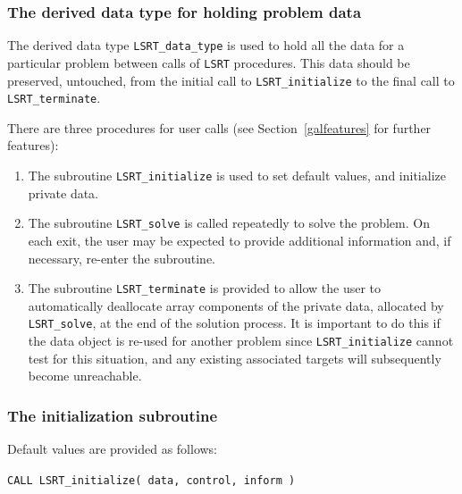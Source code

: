 \documentclass{galahad}
\newcommand{\packagename}{LS\-RT}
\begin{document}

\subsubsection{The derived data type for holding problem data}\label{typedata}
The derived data type
{\tt \packagename\_data\_type}
is used to hold all the data for a particular problem between calls of
{\tt \packagename} procedures.
This data should be preserved, untouched, from the initial call to
{\tt \packagename\_initialize}
to the final call to
{\tt \packagename\_terminate}.


\galarguments
There are three procedures for user calls
(see Section~\ref{galfeatures} for further features):

\begin{enumerate}
\item The subroutine
      {\tt \packagename\_initialize}
      is used to set default values, and initialize private data.
\item The subroutine
      {\tt \packagename\_solve}
      is called repeatedly to solve the problem.
      On each exit, the user may be expected to provide additional
      information and, if necessary, re-enter the subroutine.
\item The subroutine
      {\tt \packagename\_terminate}
      is provided to allow the user to automatically deallocate array
       components of the private data, allocated by
       {\tt \packagename\_solve},
       at the end of the solution process.
       It is important to do this if the data object is re-used for another
       problem since {\tt \packagename\_initialize} cannot test for this
       situation,
       and any existing associated targets will subsequently become
       unreachable.
\end{enumerate}


\subsubsection{The initialization subroutine}\label{subinit}
 Default values are provided as follows:

\hskip0.5in
{\tt CALL \packagename\_initialize( data, control, inform )}
\end{document}
